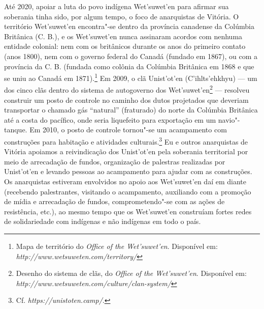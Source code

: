Até 2020, apoiar a luta do povo indígena Wet'suwet'en para afirmar sua
soberania tinha sido, por algum tempo, o foco de anarquistas de Vitória.
O território Wet'suwet'en encontra"-se dentro da província canadense da
Colúmbia Britânica (C. B.), e os Wet'suwet'en nunca assinaram acordos
com nenhuma entidade colonial: nem com os britânicos durante os anos do
primeiro contato (anos 1800), nem com o governo federal do Canadá
(fundado em 1867), ou com a província da C. B. (fundada como colônia da
Colúmbia Britânica em 1868 e que se uniu ao Canadá em 1871).\footnote{Mapa
  de território do \emph{Office of the Wet'suwet'en}. Disponível em:
  \emph{http://www.wetsuweten.com/territory/}} Em 2009, o clã Unist'ot'en
(C'ihlts'ehkhyu) --- um dos cinco clãs dentro do sistema de autogoverno
dos Wet'suwet'en\footnote{Desenho do sistema de clãs, do \emph{Office of
  the Wet'suwet'en}. Disponível em:
  \emph{http://www.wetsuweten.com/culture/clan-system/}} --- resolveu
construir um posto de controle no caminho dos dutos projetados que
deveriam transportar o chamado gás ``natural'' (fraturado) do norte da
Colúmbia Britânica até a costa do pacífico, onde seria liquefeito para
exportação em um navio"-tanque. Em 2010, o posto de controle tornou"-se um
acampamento com construções para habitação e atividades
culturais.\footnote{Cf. \emph{https://unistoten.camp/}.} Eu e outros
anarquistas de Vitória apoiamos a reivindicação dos Unist'ot'en pela
soberania territorial por meio de arrecadação de fundos, organização de
palestras realizadas por Unist'ot'en e levando pessoas ao acampamento
para ajudar com as construções. Os anarquistas estiveram envolvidos no
apoio aos Wet'suwet'en daí em diante (recebendo palestrantes, visitando
o acampamento, auxiliando com a promoção de mídia e arrecadação de
fundos, comprometendo"-se com as ações de resistência, etc.), ao mesmo
tempo que os Wet'suwet'en construíam fortes redes de solidariedade com
indígenas e não indígenas em todo o país.

